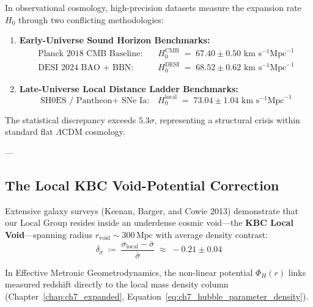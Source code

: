 \documentclass[
    12pt,
    a4paper,
    headings=normal,
    twoside=false,
    open=any,
    parskip=half
]{scrbook}
\begin{document}
In observational cosmology, high-precision datasets measure the expansion rate $H_0$ through two conflicting methodologies:
\begin{enumerate}[label=(\alph*), noitemsep]
    \item \textbf{Early-Universe Sound Horizon Benchmarks:}
    \begin{align}
    \text{Planck 2018 CMB Baseline:} \quad &H_0^{\text{CMB}} \;=\; 67.40 \pm 0.50 \text{ km} \text{ s}^{-1} \text{Mpc}^{-1} \label{eq:ch11_planck_h0_val} \\
    \text{DESI 2024 BAO + BBN:} \quad &H_0^{\text{DESI}} \;=\; 68.52 \pm 0.62 \text{ km} \text{ s}^{-1} \text{Mpc}^{-1} \label{eq:ch11_desi_h0_val}
    \end{align}
    \item \textbf{Late-Universe Local Distance Ladder Benchmarks:}
    \begin{equation}
    \text{SH0ES / Pantheon+ SNe Ia:} \quad H_0^{\text{local}} \;=\; 73.04 \pm 1.04 \text{ km} \text{ s}^{-1} \text{Mpc}^{-1} \label{eq:ch11_shoes_h0_val}
    \end{equation}
\end{enumerate}
The statistical discrepancy exceeds $5.3\sigma$, representing a structural crisis within standard flat $\Lambda$CDM cosmology.

---

\subsection{The Local KBC Void-Potential Correction}

Extensive galaxy surveys (Keenan, Barger, and Cowie 2013) demonstrate that our Local Group resides inside an underdense cosmic void---the \textbf{KBC Local Void}---spanning radius $r_{\text{void}} \sim 300\,\text{Mpc}$ with average density contrast:
\begin{equation}
\delta_\sigma \;\coloneqq\; \frac{\sigma_{\text{local}} - \bar{\sigma}}{\bar{\sigma}} \;\approx\; -0.21 \pm 0.04
\label{eq:ch11_kbc_void_contrast}
\end{equation}

In Effective Metronic Geometrodynamics, the non-linear potential $\Phi_H(r)$ links measured redshift directly to the local mass density column (Chapter~\ref{chap:ch7_expanded}, Equation~\ref{eq:ch7_hubble_parameter_density}).
\end{document}
